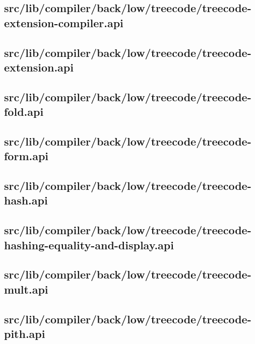 \subsection{src/lib/compiler/back/low/treecode/treecode-extension-compiler.api}


\subsection{src/lib/compiler/back/low/treecode/treecode-extension.api}


\subsection{src/lib/compiler/back/low/treecode/treecode-fold.api}


\subsection{src/lib/compiler/back/low/treecode/treecode-form.api}


\subsection{src/lib/compiler/back/low/treecode/treecode-hash.api}


\subsection{src/lib/compiler/back/low/treecode/treecode-hashing-equality-and-display.api}


\subsection{src/lib/compiler/back/low/treecode/treecode-mult.api}


\subsection{src/lib/compiler/back/low/treecode/treecode-pith.api}



